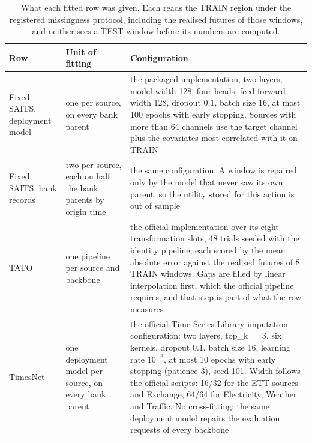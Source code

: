 \documentclass{article}
\begin{document}
\begin{table}[htbp]
  \caption{What each fitted row was given. Each reads the TRAIN region under the registered
  missingness protocol, including the realised futures of those windows, and neither sees a
  TEST window before its numbers are computed.}
  \label{tab:app-baselinecfg}
  \centering
  \small
  \setlength{\tabcolsep}{4pt}
\begin{tabular}{@{}p{} p{} p{}@{}}
    \toprule
    Row & Unit of fitting & Configuration \\
    \midrule
    Fixed SAITS, deployment model & one per source, on every bank parent & the packaged implementation, two layers, model width 128, four heads, feed-forward width 128, dropout $0.1$, batch size 16, at most 100 epochs with early stopping. Sources with more than 64 channels use the target channel plus the covariates most correlated with it on TRAIN \\
    Fixed SAITS, bank records & two per source, each on half the bank parents by origin time & the same configuration. A window is repaired only by the model that never saw its own parent, so the utility stored for this action is out of sample \\
    TATO & one pipeline per source and backbone & the official implementation over its eight transformation slots, 48 trials seeded with the identity pipeline, each scored by the mean absolute error against the realised futures of 8 TRAIN windows. Gaps are filled by linear interpolation first, which the official pipeline requires, and that step is part of what the row measures \\
    TimesNet & one deployment model per source, on every bank parent & the official Time-Series-Library imputation configuration: two layers, top\_k $=3$, six kernels, dropout $0.1$, batch size 16, learning rate $10^{-3}$, at most 10 epochs with early stopping (patience 3), seed 101. Width follows the official scripts: 16/32 for the ETT sources and Exchange, 64/64 for Electricity, Weather and Traffic. No cross-fitting: the same deployment model repairs the evaluation requests of every backbone \\
    \bottomrule
  \end{tabular}
\end{table}
\end{document}
